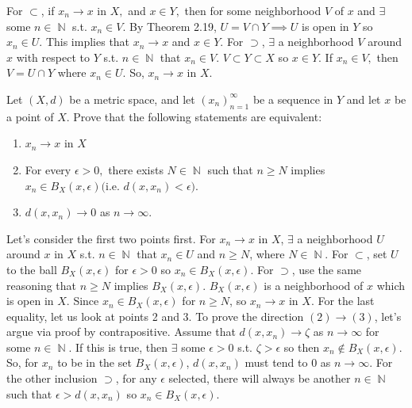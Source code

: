 \documentclass[12pt,letterpaper,boxed]{hmcpset}
\DeclareMathOperator{\N}{\mathbb{N}}
\begin{document}
\begin{solution}
For $\subset$, if $x_n \rightarrow x$ in $X,$ and $x \in Y,$ then for some neighborhood $V$ of $x$ and $\exists$ some $n \in \N$ s.t. $x_n\in V.$ By Theorem 2.19, $U=V\cap Y \implies U$ is open in $Y$ so $x_n \in U.$ This implies that $x_n \rightarrow x$ and $x\in Y$. For $\supset$, $\exists$ a neighborhood $V$ around $x$ with respect to $Y$ s.t. $n \in \N$ that $x_n\in V.$ $V\subset Y \subset X$ so $x\in Y.$ If $x_n \in V,$ then $V = U \cap Y$ where $x_n \in U.$ So, $x_n\rightarrow x$ in $X$. 
\end{solution}

\begin{problem}[Exercise 1.14]
Let $(X,d)$ be a metric space, and let $(x_n)_{n=1}^{\infty}$ be a sequence in $Y$ and let $x$ be a point of $X$. Prove that the following statements are equivalent:
\vspace{-2mm}
\begin{enumerate}
	\itemsep0em
	\item $x_n \rightarrow x$ in $X$
	\item For every $\epsilon > 0,$ there exists $N\in\N$ such that $n \ge N$ implies $x_n\in B_X(x,\epsilon) ($i.e. $ d(x, x_n) < \epsilon).$
	\item $d(x, x_n) \rightarrow 0$ as $n\rightarrow\infty$.
\end{enumerate}
\end{problem}

\begin{solution}
Let's consider the first two points first. For $x_n \rightarrow x$ in $X$, $\exists$ a neighborhood $U$ around $x$ in $X$ s.t. $n\in \N$ that $x_n\in U$ and $n\ge N$, where $N\in\N$. For $\subset$, set $U$ to the ball $B_X(x, \epsilon)$ for $\epsilon > 0$ so $x_n \in B_X(x, \epsilon)$. For $\supset$, use the same reasoning that $n \ge N$ implies $B_X(x, \epsilon)$. $B_X(x, \epsilon)$ is a neighborhood of $x$ which is open in $X$. Since $x_n \in B_X(x, \epsilon)$ for $n\ge N$, so $x_n \rightarrow x$ in $X.$ For the last equality, let us look at points 2 and 3. To prove the direction $(2) \rightarrow (3)$, let's argue via proof by contrapositive. Assume that $d(x, x_n) \rightarrow \zeta$ as $n\rightarrow\infty$ for some $n \in \N$. If this is true, then $\exists$ some $\epsilon > 0$ s.t. $\zeta > \epsilon$ so then $x_n \notin B_X(x, \epsilon).$ So, for $x_n$ to be in the set $B_X(x, \epsilon)$, $d(x, x_n)$ must tend to 0 as $n\rightarrow \infty.$ For the other inclusion $\supset$, for any $\epsilon$ selected, there will always be another $n \in \N$ such that $\epsilon > d(x,x_n)$ so $x_n\in B_X(x, \epsilon).$ 
\end{solution}
\end{document}
